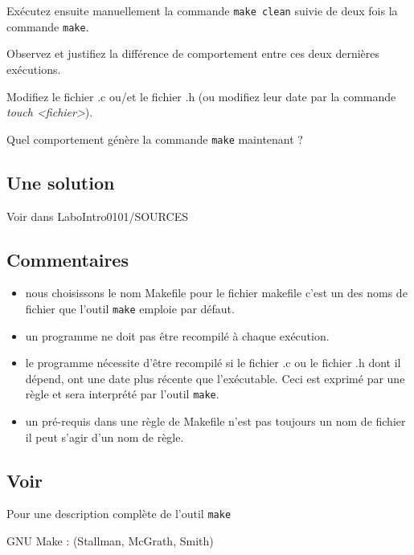 Exécutez ensuite manuellement la commande \texttt{make clean} suivie de deux fois la commande \texttt{make}. 

Observez et justifiez la différence de comportement entre ces deux dernières exécutions. 

Modifiez le fichier .c ou/et le fichier .h (ou modifiez leur date par la commande \emph{touch <fichier>}).

Quel comportement génère la commande \texttt{make} maintenant ?

\newpage %
\subsection{Une solution}

Voir dans LaboIntro0101/SOURCES





\subsection{Commentaires}

\begin{itemize}
\item nous choisissons le nom Makefile pour le fichier makefile  c'est un des noms de fichier que l'outil \texttt{make} emploie par défaut.
\item un programme ne doit pas être recompilé à chaque exécution.
\item le programme nécessite d'être recompilé si le fichier .c ou le fichier .h dont il dépend, ont une date plus récente que l'exécutable. Ceci est exprimé par une règle et sera interprété par l'outil \texttt{make}.
\item un pré-requis dans une règle de Makefile n'est pas toujours un nom de fichier il peut s'agir d'un nom de règle.
\end{itemize}

\subsection{Voir}
Pour une description complète de l'outil \texttt{make}

GNU Make : (Stallman, McGrath, Smith)
\newpage
